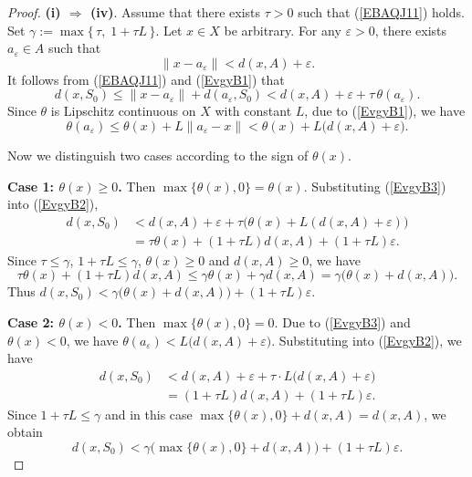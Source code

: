 \documentclass[11pt]{article}
\begin{document}
\begin{proof}
	
	\noindent\textbf{(i) $\Rightarrow$ (iv)}.
	Assume  that   there exists $\tau>0$ such that  (\ref{EBAQJ11}) holds.
	Set  
	$ \gamma := \max\{\,\tau,\;1+\tau L\,\}.$
	Let  $x\in X$      be arbitrary.   For   any    $\varepsilon>0$,  there exists $a_\varepsilon\in A$ such that
	\begin{equation}\label{EvgyB1}	\|x-a_\varepsilon\| < d(x, A)+\varepsilon  .        
	\end{equation}
	It follows from    (\ref{EBAQJ11})   and  (\ref{EvgyB1})    that   
	\begin{equation}\label{EvgyB2}
		d(x,S_0) \le \|x-a_\varepsilon\| + d(a_\varepsilon,S_0) < d(x, A)+\varepsilon + \tau\,\theta(a_\varepsilon) .
	\end{equation}
	Since  \(\theta\) is Lipschitz continuous on \(X\) with constant \(L\),  due to (\ref{EvgyB1}),  we have
	\begin{equation} \label{EvgyB3}
		\theta(a_\varepsilon) \le \theta(x) + L\|a_\varepsilon-x\| 
		< \theta(x) + L\bigl(d(x, A) + \varepsilon\bigr).  
	\end{equation}
	
	Now we distinguish two cases according to the sign of $\theta(x)$.
	
	\noindent\textbf{Case 1: $\theta(x)\ge 0$.}
	Then $\max\{\theta(x),0\}=\theta(x)$. Substituting (\ref{EvgyB3}) into (\ref{EvgyB2}),
	\[
	\begin{aligned}
		d(x,S_0) &< d(x, A)+\varepsilon + \tau\bigl(\theta(x)+L(d(x, A)+\varepsilon)\bigr) \\
		&= \tau\theta(x) + (1+\tau L)d(x, A) + (1+\tau L)\varepsilon.
	\end{aligned}
	\]
	Since $\tau\le\gamma$, $1+\tau L\le\gamma$,     $\theta(x)\ge0$  and  $  d(x, A)\ge0$, we have
	\[
	\tau\theta(x) + (1+\tau L) d(x, A) \le \gamma\theta(x) + \gamma d(x, A) = \gamma\bigl(\theta(x)+d(x, A)\bigr).
	\]
	Thus
	$	d(x,S_0) < \gamma\bigl(\theta(x)+d(x, A) \bigr) + (1+\tau L)\varepsilon.$
	
	\noindent\textbf{Case 2: $\theta(x)<0$.}
	Then $\max\{\theta(x),0\}=0$. Due to (\ref{EvgyB3})  and   $\theta(x)<0$, we have
	$\theta(a_\varepsilon) < L\bigl(d(x, A)+\varepsilon\bigr)$.
	Substituting into (\ref{EvgyB2}), we have
	\[
	\begin{aligned}
		d(x,S_0) &< d(x, A) +\varepsilon + \tau \cdot L\bigl(d(x, A) +\varepsilon\bigr) \\
		&= (1+\tau L)d(x, A) + (1+\tau L)\varepsilon.
	\end{aligned}
	\]
	Since $1+\tau L\le\gamma$ and in this case $\max\{\theta(x),0\}+d(x, A) = d(x, A)$, we obtain
	\[
	d(x,S_0) < \gamma\bigl(\max\{\theta(x),0\}+d(x, A) \bigr) + (1+\tau L)\varepsilon.
	\]
	

\end{proof}
\end{document}
